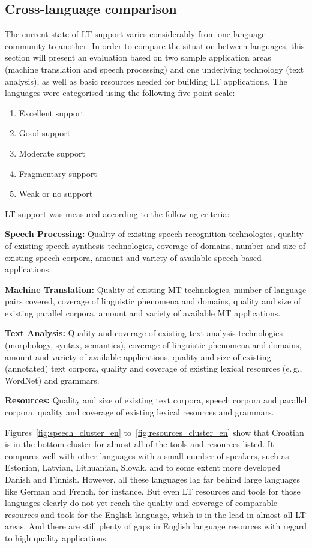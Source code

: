 \begin{multicols}{2}
\subsection{Cross-language comparison}

The current state of LT support varies considerably from one language community to another. In order to compare the situation between languages, this section will present an evaluation based on two sample application areas (machine translation and speech processing) and one underlying technology (text analysis), as well as basic resources needed for building LT applications. The languages were categorised using the following five-point scale: 

\begin{enumerate}
\item Excellent support
\item Good support
\item Moderate support
\item Fragmentary support
\item Weak or no support
\end{enumerate}

LT support was measured according to the following criteria:

\textbf{Speech Processing:} Quality of existing speech recognition technologies, quality of existing speech synthesis technologies, coverage of domains, number and size of existing speech corpora, amount and variety of available speech-based applications.

\textbf{Machine Translation:} Quality of existing MT technologies, number of language pairs covered, coverage of linguistic phenomena and domains, quality and size of existing parallel corpora, amount and variety of available MT applications.

\textbf{Text Analysis:} Quality and coverage of existing text analysis technologies (morphology, syntax, semantics), coverage of linguistic phenomena and domains, amount and variety of available applications, quality and size of existing (annotated) text corpora, quality and coverage of existing lexical resources (e.\,g., WordNet) and grammars.

\textbf{Resources:} Quality and size of existing text corpora, speech corpora and parallel corpora, quality and coverage of existing lexical resources and grammars.

Figures~\ref{fig:speech_cluster_en} to~\ref{fig:resources_cluster_en} show that Croatian is in the bottom cluster for almost all of the tools and resources listed. It compares well with other languages with a small number of speakers, such as Estonian, Latvian, Lithuanian, Slovak, and to some extent more developed Danish and Finnish. However, all these languages lag far behind large languages like German and French, for instance. But even LT resources and tools for those languages clearly do not yet reach the quality and coverage of comparable resources and tools for the English language, which is in the lead in almost all LT areas. And there are still plenty of gaps in English language resources with regard to high quality applications.
 

\end{multicols}
